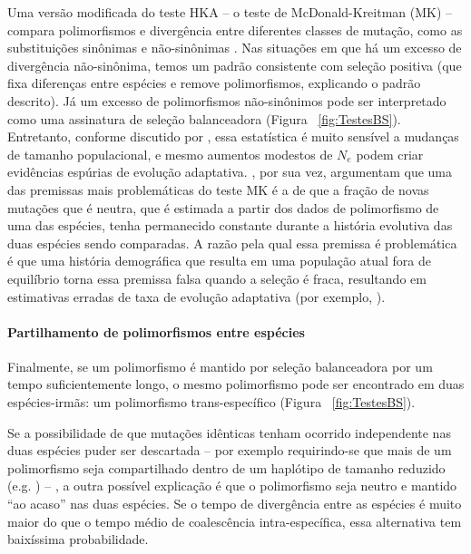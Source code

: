 \begin{refsection}
	Uma versão modificada do teste HKA -- o teste de McDonald-Kreitman (MK) -- compara polimorfismos e divergência entre diferentes classes de mutação, como as substituições sinônimas e não-sinônimas \parencite{McDonald1991}. Nas situações em que há um excesso de divergência não-sinônima, temos um padrão consistente com seleção positiva (que fixa diferenças entre espécies e remove polimorfismos, explicando o padrão descrito). Já um excesso de polimorfismos não-sinônimos pode ser interpretado como uma assinatura de seleção balanceadora (Figura ~\ref{fig:TestesBS}). 
    Entretanto, conforme discutido por \textcite{Eyre-Walker2006}, essa estatística é muito sensível a mudanças de tamanho populacional, e mesmo aumentos modestos de $N_{e}$ podem criar evidências espúrias de evolução adaptativa. \textcite{Sella2009}, por sua vez, argumentam que uma das premissas mais problemáticas do teste MK é a de que a fração de novas mutações que é neutra, que é estimada a partir dos dados de polimorfismo de uma das espécies, tenha permanecido constante durante a história evolutiva das duas espécies sendo comparadas. A razão pela qual essa premissa é problemática é que uma história demográfica que resulta em uma população atual fora de equilíbrio torna essa premissa falsa quando a seleção é fraca, resultando em estimativas erradas de taxa de evolução adaptativa (por exemplo, \cite{Eyre-Walker2006,Fay2001,Nielsen2005,Sella2009}).
    




\paragraph{Partilhamento de polimorfismos entre espécies} Finalmente, se um polimorfismo é mantido por seleção balanceadora por um tempo suficientemente longo, o mesmo polimorfismo pode ser encontrado em duas espécies-irmãs: um polimorfismo trans-específico \parencite{Hedrick2012,Klein1998} (Figura ~\ref{fig:TestesBS}). 

Se a possibilidade de que mutações idênticas tenham ocorrido independente nas duas espécies puder ser descartada -- por exemplo requirindo-se que mais de um polimorfismo seja compartilhado dentro de um haplótipo de tamanho reduzido (e.g. \cite{Leffler2013a,Teixeira2015}) -- , a outra possível explicação é que o polimorfismo seja neutro e mantido \enquote{ao acaso} nas duas espécies. Se o tempo de divergência entre as espécies é muito maior do que o tempo médio de coalescência intra-específica, essa alternativa tem baixíssima probabilidade. 


\end{refsection}
